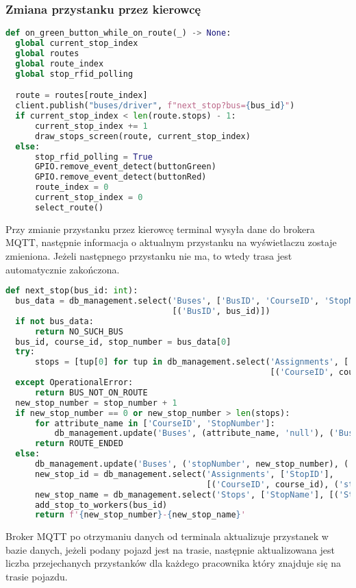 \subsubsection{Zmiana przystanku przez kierowcę}
\begin{lstlisting}[language={Python}, caption={Terminal, Lokalizacja: \texttt{client/client.py}}]
def on_green_button_while_on_route(_) -> None:
  global current_stop_index
  global routes
  global route_index
  global stop_rfid_polling

  route = routes[route_index]
  client.publish("buses/driver", f"next_stop?bus={bus_id}")
  if current_stop_index < len(route.stops) - 1:
      current_stop_index += 1
      draw_stops_screen(route, current_stop_index)
  else:
      stop_rfid_polling = True
      GPIO.remove_event_detect(buttonGreen)
      GPIO.remove_event_detect(buttonRed)
      route_index = 0
      current_stop_index = 0
      select_route()
\end{lstlisting}
Przy zmianie przystanku przez kierowcę terminal wysyła dane do brokera MQTT, następnie informacja o aktualnym przystanku na wyświetlaczu zostaje zmieniona. Jeżeli następnego przystanku nie ma, to wtedy trasa jest automatycznie zakończona.
\begin{lstlisting}[language={Python}, caption={Broker MQTT, Lokalizacja: \texttt{backend/mqtt\_server.py}}]
def next_stop(bus_id: int):
  bus_data = db_management.select('Buses', ['BusID', 'CourseID', 'StopNumber'],
                                  [('BusID', bus_id)])
  if not bus_data:
      return NO_SUCH_BUS
  bus_id, course_id, stop_number = bus_data[0]
  try:
      stops = [tup[0] for tup in db_management.select('Assignments', ['StopID'],
                                                      [('CourseID', course_id)])]
  except OperationalError:
      return BUS_NOT_ON_ROUTE
  new_stop_number = stop_number + 1
  if new_stop_number == 0 or new_stop_number > len(stops):
      for attribute_name in ['CourseID', 'StopNumber']:
          db_management.update('Buses', (attribute_name, 'null'), ('BusID', bus_id))
      return ROUTE_ENDED
  else:
      db_management.update('Buses', ('stopNumber', new_stop_number), ('BusID', bus_id))
      new_stop_id = db_management.select('Assignments', ['StopID'],
                                         [('CourseID', course_id), ('stopNumber', new_stop_number)])[0][0]
      new_stop_name = db_management.select('Stops', ['StopName'], [('StopID', new_stop_id)])[0][0]
      add_stop_to_workers(bus_id)
      return f'{new_stop_number}-{new_stop_name}'
\end{lstlisting}
Broker MQTT po otrzymaniu danych od terminala aktualizuje przystanek w bazie danych, jeżeli podany pojazd jest na trasie, następnie aktualizowana jest liczba przejechanych przystanków dla każdego pracownika który znajduje się na trasie pojazdu.
